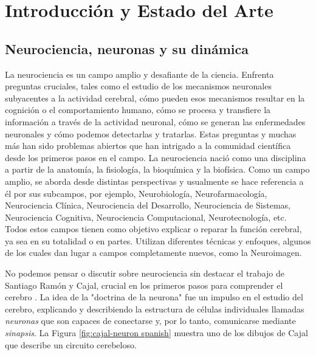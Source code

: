 \chapter{Introducción y Estado del Arte}
\label{c-intro spanish}

\section{Neurociencia, neuronas y su dinámica}
La neurociencia es un campo amplio y desafiante de la ciencia. Enfrenta preguntas cruciales, tales como el estudio de los mecanismos neuronales subyacentes a la actividad cerebral, cómo pueden esos mecanismos resultar en la cognición o el comportamiento humano, cómo se procesa y transfiere la información a través de la actividad neuronal, cómo se generan las enfermedades neuronales y cómo podemos detectarlas y tratarlas. 
Estas preguntas y muchas más han sido problemas abiertos que han intrigado a la comunidad científica desde los primeros pasos en el campo. La neurociencia nació como una disciplina a partir de la anatomía, la fisiología, la bioquímica y la biofísica. Como un campo amplio, se aborda desde distintas perspectivas y usualmente se hace referencia a él por sus subcampos, por ejemplo, Neurobiología, Neurofarmacología, Neurociencia Clínica, Neurociencia del Desarrollo, Neurociencia de Sistemas, Neurociencia Cognitiva, Neurociencia Computacional, Neurotecnología, etc. Todos estos campos tienen como objetivo explicar o reparar la función cerebral, ya sea en su totalidad o en partes. Utilizan diferentes técnicas y enfoques, algunos de los cuales dan lugar a campos completamente nuevos, como la Neuroimagen.

No podemos pensar o discutir sobre neurociencia sin destacar el trabajo de Santiago Ramón y Cajal, crucial en los primeros pasos para comprender el cerebro \parencite{ramon_y_cajal_textura_1899,de_carlos_historical_2007,de_castro_editorial_2016,delgado-garcia_cajal_2015,de_castro_cajal_2019}. La idea de la "doctrina de la neurona" fue un impulso en el estudio del cerebro, explicando y describiendo la estructura de células individuales llamadas \textit{neuronas} que son capaces de conectarse y, por lo tanto, comunicarse mediante \textit{sinapsis}. La Figura \ref{fig:cajal-neuron spanish} muestra uno de los dibujos de Cajal que describe un circuito cerebeloso.

